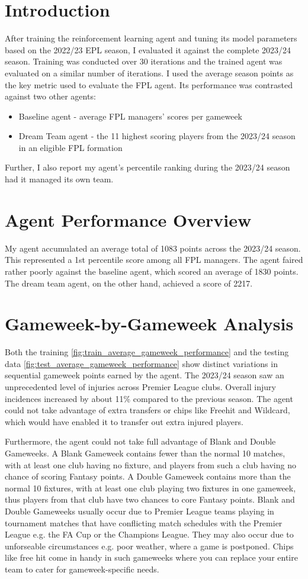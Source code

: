 \section{Introduction}
After training the reinforcement learning agent and tuning its model parameters based on the 2022/23 EPL season, I evaluated it against the complete 2023/24 season. Training was conducted over 30 iterations and the trained agent was evaluated on a similar number of iterations. I used the average season points as the key metric used to evaluate the FPL agent. Its performance was contrasted against two other agents:
\begin{itemize}
    \item Baseline agent - average FPL managers' scores per gameweek
    \item Dream Team agent - the 11 highest scoring players from the 2023/24 season in an eligible FPL formation
\end{itemize}
Further, I also report my agent's percentile ranking during the 2023/24 season had it managed its own team.

\section{Agent Performance Overview}
My agent accumulated an average total of 1083 points across the 2023/24 season. This represented a 1st percentile score among all FPL managers. The agent faired rather poorly against the baseline agent, which scored an average of 1830 points. The dream team agent, on the other hand, achieved a score of 2217. \cite{fantasyfootballpundit2024}

\section{Gameweek-by-Gameweek Analysis}
Both the training \ref{fig:train_average_gameweek_performance} and the testing data \ref{fig:test_average_gameweek_performance} show distinct variations in sequential gameweek points earned by the agent. The 2023/24 season saw an unprecedented level of injuries across Premier League clubs. Overall injury incidences increased by about 11\% compared to the previous season. The agent could not take advantage of extra transfers or chips like Freehit and Wildcard, which would have enabled it to transfer out extra injured players.

Furthermore, the agent could not take full advantage of Blank and Double Gameweeks. A Blank Gameweek contains fewer than the normal 10 matches, with at least one club having no fixture, and players from such a club having no chance of scoring Fantasy points. A Double Gameweek contains more than the normal 10 fixtures, with at least one club playing two fixtures in one gameweek, thus players from that club have two chances to core Fantasy points. Blank and Double Gameweeks usually occur due to Premier League teams playing in tournament matches that have conflicting match schedules with the Premier League e.g. the FA Cup or the Champions League. They may also occur due to unforseable circumstances e.g. poor weather, where a game is postponed. Chips like free hit come in handy in such gameweeks where you can replace your entire team to cater for gameweek-specific needs.

